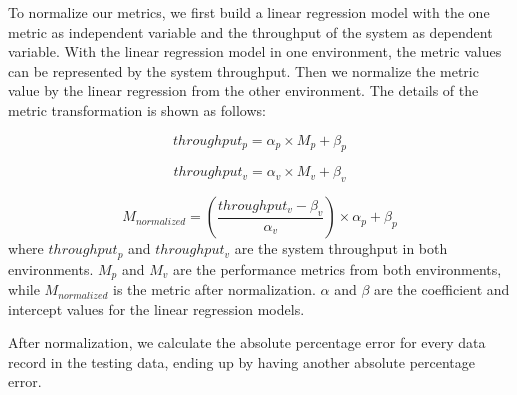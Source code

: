 

To normalize our metrics, we first build a linear regression model with the one metric as independent variable and the throughput of the system as dependent variable. With the linear regression model in one environment, the metric values can be represented by the system throughput. Then we normalize the metric value by the linear regression from the other environment. The details of the metric transformation is shown as follows:

\begin{equation*}
throughput_{p}= \alpha_{p} \times M_{p} + \beta_{p}
\end{equation*}

\begin{equation*}
throughput_{v}= \alpha_{v} \times M_{v} + \beta_{v}
\end{equation*}

\begin{equation*}
M_{normalized} = (\frac{throughput_{v}-\beta_{v}}{\alpha_{v}})\times\alpha_{p}+\beta_{p}
\end{equation*}
where $throughput_{p}$ and $throughput_{v}$ are the system throughput in both environments. $M_{p}$ and $M_{v}$ are the performance metrics from both environments, while $M_{normalized}$ is the metric after normalization. $\alpha$ and $\beta$ are the coefficient and intercept values for the linear regression models.

After normalization, we calculate the absolute percentage error for every data record in the testing data, ending up by having another absolute percentage error.






